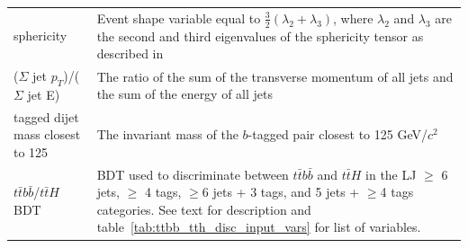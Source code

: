 \begin{table}[hbtp]
\begin{tabular}{| l | p{10cm} |}
   sphericity  									&  Event shape variable equal to $\frac{3}{2} (\lambda_{2} + \lambda_{3})$, where $\lambda_{2}$ and $\lambda_{3}$ are the second and third eigenvalues of the sphericity tensor as described in~\cite{PhysRevD.1.1416} \\
   (\(\Sigma\) jet \(p_{T}\))/(\(\Sigma\) jet E)					& The ratio of the sum of the transverse momentum of all jets and the sum of the energy of all jets \\
   tagged dijet mass closest to 125						& The invariant mass of the $b$-tagged pair closest to 125 GeV/$c^2$ \\
   \(t\bar{t}b\bar{b}\)/\(t\bar{t}H\) BDT						& BDT used to discriminate between \(t\bar{t}b\bar{b}\) and \(t\bar{t}H\) in the LJ $\geq$ 6 jets, $\geq$ 4 tags, $\geq$6 jets + 3 tags, and 5 jets + $\geq$4 tags categories. See text for description and table~\ref{tab:ttbb_tth_disc_input_vars} for list of variables.\\
   \hline
 \end{tabular}
\end{table}


